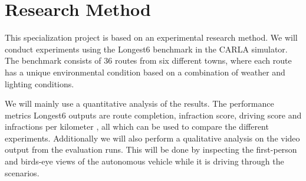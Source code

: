 \section{Research Method}

This specialization project is based on an experimental research method. We will conduct experiments using the Longest6 benchmark in the CARLA simulator. The benchmark consists of 36 routes from six different towns, where each route has a unique environmental condition based on a combination of weather and lighting conditions.

We will mainly use a quantitative analysis of the results. The performance metrics Longest6 outputs are route completion, infraction score, driving score and infractions per kilometer \cite{transfuser-pami}, all which can be used to compare the different experiments. Additionally we will also perform a qualitative analysis on the video output from the evaluation runs. This will be done by inspecting the first-person and birds-eye views of the autonomous vehicle while it is driving through the scenarios.
